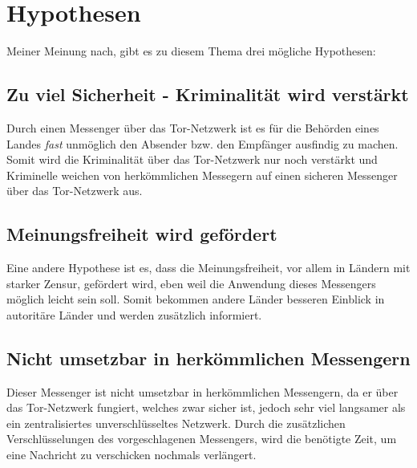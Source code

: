 \documentclass[a4paper,10pt,ngerman,
  headheight=28pt,]{scrartcl}
\begin{document}
\section{Hypothesen}
Meiner Meinung nach, gibt es zu diesem Thema drei mögliche Hypothesen:
\subsection{Zu viel Sicherheit - Kriminalität wird verstärkt}
Durch einen Messenger über das Tor-Netzwerk ist es für die Behörden eines Landes \textit{fast} unmöglich den Absender bzw. den Empfänger ausfindig zu machen. Somit wird die Kriminalität über das Tor-Netzwerk nur noch verstärkt und Kriminelle weichen von herkömmlichen Messegern auf einen sicheren Messenger über das Tor-Netzwerk aus.

\subsection{Meinungsfreiheit wird gefördert}
Eine andere Hypothese ist es, dass die Meinungsfreiheit, vor allem in Ländern mit starker Zensur, gefördert wird, eben weil die Anwendung dieses Messengers möglich leicht sein soll. Somit bekommen andere Länder besseren Einblick in autoritäre Länder und werden zusätzlich informiert.

\subsection{Nicht umsetzbar in herkömmlichen Messengern}
Dieser Messenger ist nicht umsetzbar in herkömmlichen Messengern, da er über das Tor-Netzwerk fungiert, welches zwar sicher ist, jedoch sehr viel langsamer als ein zentralisiertes unverschlüsseltes Netzwerk. Durch die zusätzlichen Verschlüsselungen des vorgeschlagenen Messengers, wird die benötigte Zeit, um eine Nachricht zu verschicken nochmals verlängert.

\printbibliography %
\end{document}
